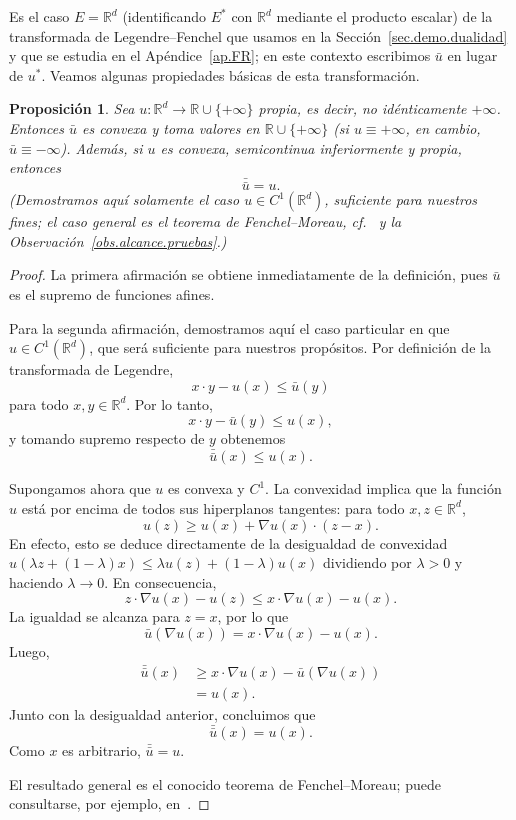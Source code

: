 \documentclass[12pt, a4paper]{amsbook}
\newcommand{\R}{{\mathbb R}}
\newtheorem{prop}[teo]{Proposición}
\theoremstyle{remark}
\theoremstyle{definition}
\numberwithin{section}{chapter}
\numberwithin{subsection}{section}
\numberwithin{equation}{section}
\numberwithin{figure}{chapter}
\begin{document}
Es el caso $E=\R^d$ (identificando $E^*$ con $\R^d$ mediante el producto
escalar) de la transformada de Legendre--Fenchel que usamos en la
Sección~\ref{sec.demo.dualidad} y que se estudia en el
Apéndice~\ref{ap.FR}; en este contexto escribimos $\bar u$ en lugar de $u^*$.
Veamos algunas propiedades básicas de esta transformación.

\begin{prop}\label{prop.legendre.involucion}
Sea $u\colon\mathbb R^d\to\mathbb R\cup\{+\infty\}$ propia, es decir, no
idénticamente $+\infty$. Entonces $\bar u$ es convexa y toma valores en
$\mathbb R\cup\{+\infty\}$ (si $u\equiv+\infty$, en cambio,
$\bar u\equiv-\infty$). Además, si $u$ es convexa, semicontinua inferiormente
y propia, entonces
\[
\bar{\bar u}=u.
\]
(Demostramos aquí solamente el caso $u\in C^1(\R^d)$, suficiente para
nuestros fines; el caso general es el teorema de Fenchel--Moreau,
cf.~\cite{Rockafellar1970} y la Observación~\ref{obs.alcance.pruebas}.)
\end{prop}

\begin{proof}
La primera afirmación se obtiene inmediatamente de la definición, pues
$\bar u$ es el supremo de funciones afines.

Para la segunda afirmación, demostramos aquí el caso particular en que
$u\in C^1(\mathbb R^d)$, que será suficiente para nuestros propósitos. Por
definición de la transformada de Legendre,
\[
x\cdot y-u(x)\leq \bar u(y)
\]
para todo $x,y\in\mathbb R^d$. Por lo tanto,
\[
x\cdot y-\bar u(y)\leq u(x),
\]
y tomando supremo respecto de $y$ obtenemos
\[
\bar{\bar u}(x)\leq u(x).
\]

Supongamos ahora que $u$ es convexa y $C^1$. La convexidad implica que la
función $u$ está por encima de todos sus hiperplanos tangentes: para todo
$x,z\in\mathbb R^d$,
\[
u(z)\geq u(x)+\nabla u(x)\cdot(z-x).
\]
En efecto, esto se deduce directamente de la desigualdad de convexidad
$u(\lambda z+(1-\lambda)x)\leq\lambda u(z)+(1-\lambda)u(x)$
dividiendo por $\lambda>0$ y haciendo $\lambda\to0$.
En consecuencia,
\[
z\cdot\nabla u(x)-u(z)
\leq
x\cdot\nabla u(x)-u(x).
\]
La igualdad se alcanza para $z=x$, por lo que
\[
\bar u(\nabla u(x))
=
x\cdot\nabla u(x)-u(x).
\]
Luego,
\[
\begin{aligned}
\bar{\bar u}(x)
&\geq
x\cdot\nabla u(x)-\bar u(\nabla u(x))\\
&=u(x).
\end{aligned}
\]
Junto con la desigualdad anterior, concluimos que
\[
\bar{\bar u}(x)=u(x).
\]
Como $x$ es arbitrario, $\bar{\bar u}=u$.

El resultado general es el conocido teorema de Fenchel--Moreau; puede
consultarse, por ejemplo, en~\cite{Rockafellar1970}.
\end{proof}
\end{document}
